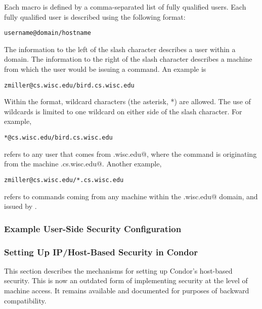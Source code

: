 
Each macro is defined by a comma-separated list of fully qualified
users.
Each
fully qualified user
is described using the following format:
\begin{verbatim}
username@domain/hostname
\end{verbatim}
The information to the left of the slash character describes
a user within a domain.
The information to the right of the slash character describes
a machine from which the user would be issuing a command. 
An example is
\begin{verbatim}
zmiller@cs.wisc.edu/bird.cs.wisc.edu
\end{verbatim}

Within the format, wildcard characters (the asterisk, *) are allowed.
The use of wildcards is limited to one wildcard on either side
of the slash character.
For example,
\begin{verbatim}
*@cs.wisc.edu/bird.cs.wisc.edu
\end{verbatim}
refers to any user that comes from \verb@cs.wisc.edu@,
where the command is originating from the machine
\verb@bird.cs.wisc.edu@.
Another example,
\begin{verbatim}
zmiller@cs.wisc.edu/*.cs.wisc.edu
\end{verbatim}
refers to commands coming from any machine within the 
\verb@cs.wisc.edu@ domain, and issued by \verb@zmiller@.

\subsubsection{\label{sec:Security-sample2} Example User-Side Security Configuration}
\Todo

\subsubsection{\label{sec:Host-Security}Setting Up IP/Host-Based Security in
Condor} 

This section describes the mechanisms for setting up Condor's
host-based security.  
This is now an outdated form of implementing security at
the level of machine access. 
It remains available and documented for purposes of backward compatibility.

